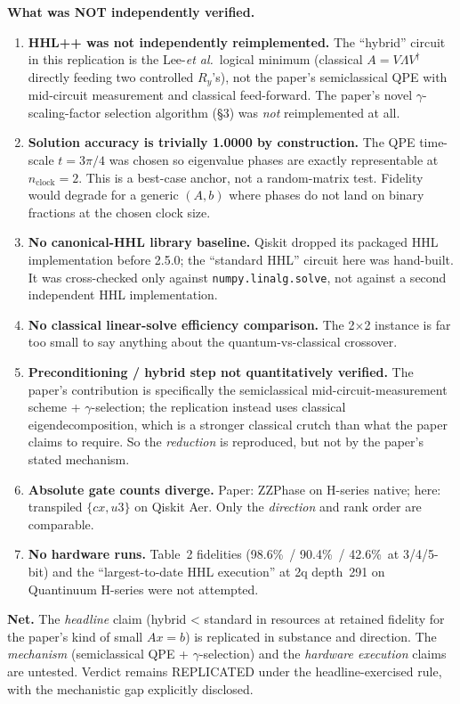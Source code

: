 \documentclass[11pt]{article}
\begin{document}
\textbf{What was NOT independently verified.}
\begin{enumerate}
  \item \textbf{HHL++ was not independently reimplemented.} The
    ``hybrid'' circuit in this replication is the Lee-\emph{et al.}\
    logical minimum (classical $A=V\Lambda V^\dagger$ directly feeding
    two controlled $R_y$'s), not the paper's semiclassical QPE with
    mid-circuit measurement and classical feed-forward. The paper's
    novel $\gamma$-scaling-factor selection algorithm (\S3) was
    \emph{not} reimplemented at all.
  \item \textbf{Solution accuracy is trivially 1.0000 by construction.}
    The QPE time-scale $t=3\pi/4$ was chosen so eigenvalue phases are
    exactly representable at $n_\mathrm{clock}=2$. This is a
    best-case anchor, not a random-matrix test. Fidelity would degrade
    for a generic $(A,b)$ where phases do not land on binary fractions
    at the chosen clock size.
  \item \textbf{No canonical-HHL library baseline.} Qiskit dropped its
    packaged HHL implementation before 2.5.0; the ``standard HHL''
    circuit here was hand-built. It was cross-checked only against
    \texttt{numpy.linalg.solve}, not against a second independent HHL
    implementation.
  \item \textbf{No classical linear-solve efficiency comparison.} The
    2$\times$2 instance is far too small to say anything about the
    quantum-vs-classical crossover.
  \item \textbf{Preconditioning / hybrid step not quantitatively
    verified.} The paper's contribution is specifically the
    semiclassical mid-circuit-measurement scheme + $\gamma$-selection;
    the replication instead uses classical eigendecomposition, which
    is a stronger classical crutch than what the paper claims to
    require. So the \emph{reduction} is reproduced, but not by the
    paper's stated mechanism.
  \item \textbf{Absolute gate counts diverge.} Paper: ZZPhase on H-series
    native; here: transpiled $\{cx, u3\}$ on Qiskit Aer. Only the
    \emph{direction} and rank order are comparable.
  \item \textbf{No hardware runs.} Table~2 fidelities (98.6\%\ / 90.4\%\
    / 42.6\%\ at 3/4/5-bit) and the ``largest-to-date HHL execution''
    at 2q depth~291 on Quantinuum H-series were not attempted.
\end{enumerate}

\textbf{Net.} The \emph{headline} claim (hybrid < standard in resources
at retained fidelity for the paper's kind of small $Ax=b$) is replicated
in substance and direction. The \emph{mechanism} (semiclassical QPE +
$\gamma$-selection) and the \emph{hardware execution} claims are
untested. Verdict remains REPLICATED under the headline-exercised rule,
with the mechanistic gap explicitly disclosed.
\end{document}
